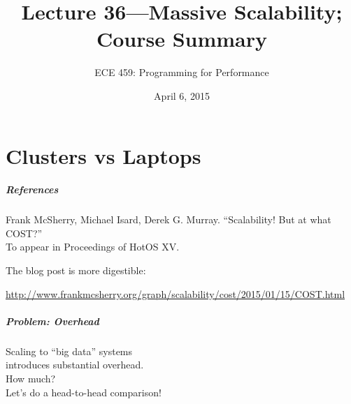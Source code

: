 \documentclass[aspectratio=43]{beamer}
\title{Lecture 36---Massive Scalability; Course Summary}
\subtitle{ECE 459: Programming for Performance}
\date{April 6, 2015}
\newenvironment{changemargin}[1]{%
  \begin{list}{}{%
    \setlength{\topsep}{0pt}%
    \setlength{\leftmargin}{#1}%
    \setlength{\rightmargin}{1em}
    \setlength{\listparindent}{\parindent}%
    \setlength{\itemindent}{\parindent}%
    \setlength{\parsep}{\parskip}%
  }%
  \item[]}{\end{list}}
\begin{document}
\begin{frame}[plain]
  \titlepage
\end{frame}

\part{Clusters vs Laptops}
\frame{\partpage}

\begin{frame}
  \frametitle{References}

  \begin{changemargin}{1cm}
{\Large
Frank McSherry, Michael Isard, Derek G. Murray. ``Scalability! But at what COST?'' \\
To appear in Proceedings of HotOS XV.\\[1em]}

The blog post is more digestible:\\
  \end{changemargin}
{\scriptsize
\hspace*{1cm} \url{http://www.frankmcsherry.org/graph/scalability/cost/2015/01/15/COST.html}
}
\end{frame}

\begin{frame}
  \frametitle{Problem: Overhead}
  \begin{changemargin}{2cm}
\Large
    Scaling to ``big data'' systems\\
    introduces substantial overhead.\\[1em]

    How much?\\
 Let's do a head-to-head comparison!
  \end{changemargin}
\end{frame}
\end{document}
